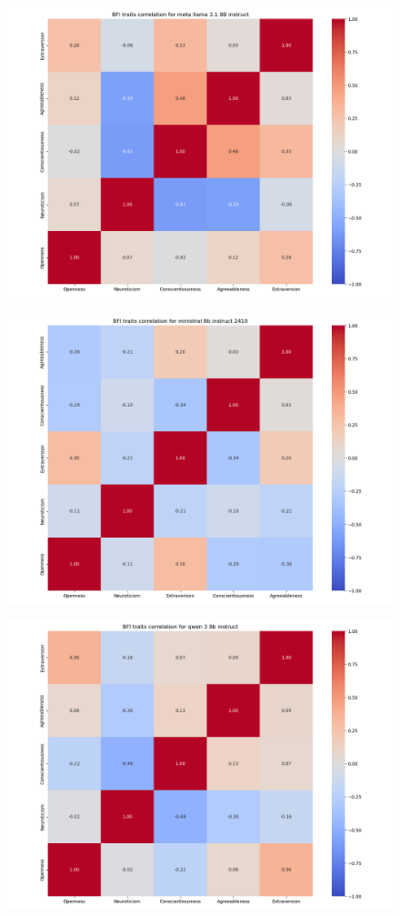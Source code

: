 \documentclass{article}
\begin{document}
\begin{figure}[H]
    \centering
    \includegraphics[width=0.7 \linewidth]{../Prompt_code/plots/meta-llama-3.1-8B-instruct/bfi_correlation.png}
\end{figure}

\begin{figure}[H]
    \centering
    \includegraphics[width=0.7 \linewidth]{../Prompt_code/plots/ministral-8b-instruct-2410/bfi_correlation.png}
\end{figure}

\begin{figure}[H]
    \centering
    \includegraphics[width=0.7 \linewidth]{../Prompt_code/plots/qwen-3-8b-instruct/bfi_correlation.png}
\end{figure}
\end{document}
